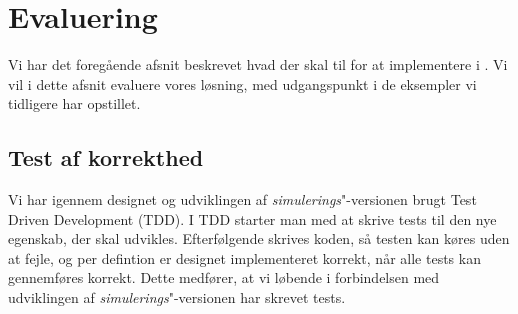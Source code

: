 \section{Evaluering}
\label{sec:des-eval}
Vi har  det foregående afsnit beskrevet hvad der skal til for at implementere \des i \pycsp. Vi vil i dette afsnit evaluere vores løsning, med udgangspunkt i de eksempler vi tidligere har opstillet. 
\subsection{Test af korrekthed}
  Vi har igennem designet og udviklingen af \emph{simulerings}"-versionen brugt Test Driven Development (TDD). I TDD starter man med at skrive tests til den nye egenskab, der skal udvikles. Efterfølgende skrives koden, så testen kan køres uden at fejle, og per defintion er designet implementeret korrekt, når alle tests kan gennemføres korrekt. Dette medfører, at vi løbende i forbindelsen med udviklingen af \emph{simulerings}"-versionen har skrevet tests. 
  
